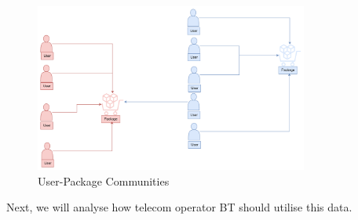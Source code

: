 \documentclass[ %
                    author={Tengyao Tu},
                supervisor={Dr. James Pope},
                    degree={MSc},
                     title={A New Perspective on Graph Community Detection: Combining Traditional Methods with Deep Learning Approaches},
                  subtitle={Applying to Telecom Networks and Diverse Datasets},
                      type={},
                      year={2024}]{dissertation}
\begin{document}
\begin{figure}[h] %
    \centering
    \includegraphics[width=0.8\textwidth]{Figure_19.png} %
    \caption{User-Package Communities}
    \label{virtual Graph Data Map}
\end{figure}
Next, we will analyse how telecom operator BT should utilise this data.
\end{document}
